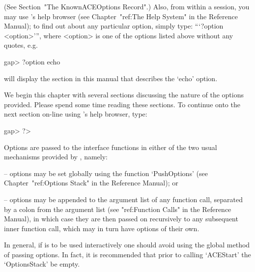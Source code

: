 \endexample

(See Section~"The KnownACEOptions Record".) Also, from within a {\GAP}
session, you may use {\GAP}'s help browser (see Chapter~"ref:The  Help
System" in the  {\GAP}  Reference  Manual);  to  find  out  about  any
particular {\ACE} option, simply type: ```?option  <option>''',  where
<option> is one of the options listed above without any quotes, e.g.

\begintt
gap> ?option echo
\endtt

will display the section in this  manual  that  describes  the  `echo'
option.

We begin this chapter with several sections discussing the  nature  of
the options provided. Please spend some time reading  these  sections.
To continue onto the next section on-line using {\GAP}'s help browser,
type:

\begintt
gap> ?>
\endtt


Options are passed to the {\ACE} interface functions in either of the
two usual mechanisms provided by {\GAP}, namely:

\beginlist%

\item{--} options may be set globally using the function `PushOptions'
(see Chapter~"ref:Options Stack" in the {\GAP} Reference  Manual); or

\item{--} options may be appended to the argument list of any function
call, separated by a colon from the argument list  (see  "ref:Function
Calls" in the {\GAP} Reference Manual), in which case  they  are  then
passed on recursively to any subsequent inner function call, which may
in turn have options of their own.

\endlist

In general, if {\ACE} is to be used  interactively  one  should  avoid
using the global method of passing options. In fact, it is recommended
that prior to calling `ACEStart' the `OptionsStack' be empty.


